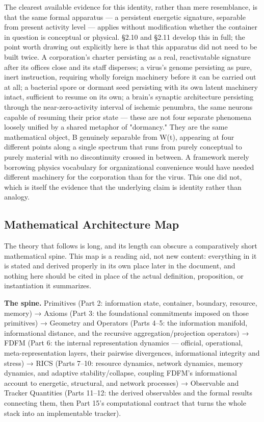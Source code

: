 \documentclass[
]{article}
\begin{document}
The clearest available evidence for this identity, rather than mere
resemblance, is that the same formal apparatus --- a persistent
energetic signature, separable from present activity level --- applies
without modification whether the container in question is conceptual or
physical. §2.10 and §2.11 develop this in full; the point worth drawing
out explicitly here is that this apparatus did not need to be built
twice. A corporation's charter persisting as a real, reactivatable
signature after its offices close and its staff disperses; a virus's
genome persisting as pure, inert instruction, requiring wholly foreign
machinery before it can be carried out at all; a bacterial spore or
dormant seed persisting with its own latent machinery intact, sufficient
to resume on its own; a brain's synaptic architecture persisting through
the near-zero-activity interval of ischemic penumbra, the same neurons
capable of resuming their prior state --- these are not four separate
phenomena loosely unified by a shared metaphor of "dormancy." They are
the same mathematical object, B genuinely separable from W(t), appearing
at four different points along a single spectrum that runs from purely
conceptual to purely material with no discontinuity crossed in between.
A framework merely borrowing physics vocabulary for organizational
convenience would have needed different machinery for the corporation
than for the virus. This one did not, which is itself the evidence that
the underlying claim is identity rather than analogy.

\hypertarget{mathematical-architecture-map}{%
\subsection{Mathematical Architecture
Map}\label{mathematical-architecture-map}}

The theory that follows is long, and its length can obscure a
comparatively short mathematical spine. This map is a reading aid, not
new content: everything in it is stated and derived properly in its own
place later in the document, and nothing here should be cited in place
of the actual definition, proposition, or instantiation it summarizes.

\textbf{The spine.} Primitives (Part 2: information state, container,
boundary, resource, memory) → Axioms (Part 3: the foundational
commitments imposed on those primitives) → Geometry and Operators (Parts
4--5: the information manifold, informational distance, and the
recursive aggregation/projection operators) → FDFM (Part 6: the internal
representation dynamics --- official, operational, meta-representation
layers, their pairwise divergences, informational integrity and stress)
→ RICS (Parts 7--10: resource dynamics, network dynamics, memory
dynamics, and adaptive stability/collapse, coupling FDFM's informational
account to energetic, structural, and network processes) → Observable
and Tracker Quantities (Parts 11--12: the derived observables and the
formal results connecting them, then Part 15's computational contract
that turns the whole stack into an implementable tracker).
\end{document}
